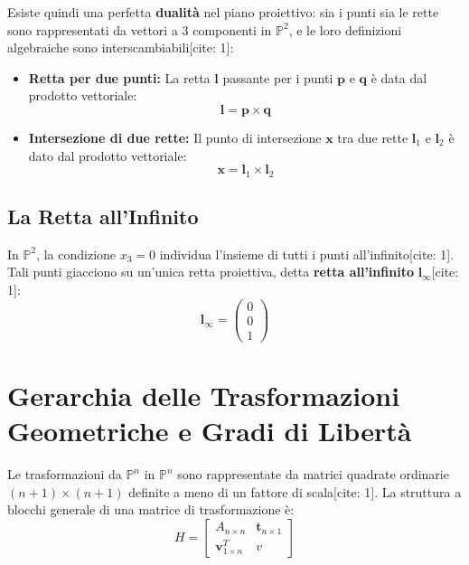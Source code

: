 Esiste quindi una perfetta \textbf{dualità} nel piano proiettivo: sia i punti sia le rette sono rappresentati da vettori a $3$ componenti in $\mathbb{P}^2$, e le loro definizioni algebraiche sono interscambiabili[cite: 1]:
\begin{itemize}
    \item \textbf{Retta per due punti:} La retta $\mathbf{l}$ passante per i punti $\mathbf{p}$ e $\mathbf{q}$ è data dal prodotto vettoriale:
    \begin{equation}
    \mathbf{l} = \mathbf{p} \times \mathbf{q}
    \end{equation}
    \item \textbf{Intersezione di due rette:} Il punto di intersezione $\mathbf{x}$ tra due rette $\mathbf{l}_1$ e $\mathbf{l}_2$ è dato dal prodotto vettoriale:
    \begin{equation}
    \mathbf{x} = \mathbf{l}_1 \times \mathbf{l}_2
    \end{equation}
\end{itemize}

\subsection{La Retta all'Infinito}
In $\mathbb{P}^2$, la condizione $x_3 = 0$ individua l'insieme di tutti i punti all'infinito[cite: 1]. Tali punti giacciono su un'unica retta proiettiva, detta \textbf{retta all'infinito} $\mathbf{l}_\infty$[cite: 1]:
\begin{equation}
\mathbf{l}_\infty = \begin{pmatrix} 0 \\ 0 \\ 1 \end{pmatrix}
\end{equation}

\section{Gerarchia delle Trasformazioni Geometriche e Gradi di Libertà}
Le trasformazioni da $\mathbb{P}^n$ in $\mathbb{P}^n$ sono rappresentate da matrici quadrate ordinarie $(n+1) \times (n+1)$ definite a meno di un fattore di scala[cite: 1]. La struttura a blocchi generale di una matrice di trasformazione è:
\begin{equation}
H = \begin{bmatrix} A_{n \times n} & \mathbf{t}_{n \times 1} \\ \mathbf{v}^T_{1 \times n} & v \end{bmatrix}
\end{equation}

